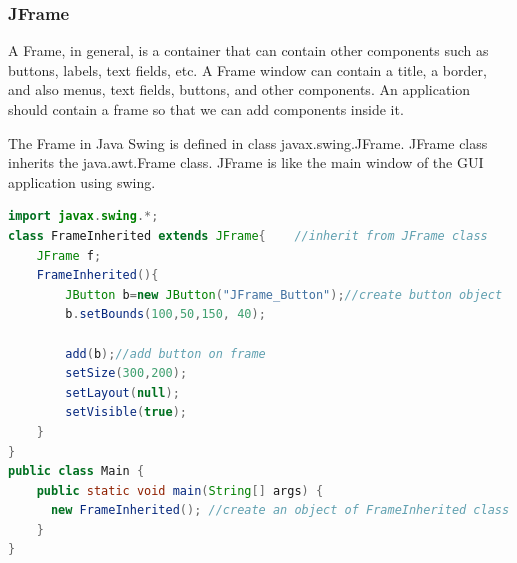 \documentclass[11pt]{article}
\begin{document}
\subsubsection{JFrame}

A Frame, in general, is a container that can contain other components such as buttons, labels, text fields, etc. A Frame window can contain a title, a border, and also menus, text fields, buttons, and other components. An application should contain a frame so that we can add components inside it.

The Frame in Java Swing is defined in class javax.swing.JFrame. JFrame class inherits the java.awt.Frame class. JFrame is like the main window of the GUI application using swing.

\begin{lstlisting}[language=Java]
import javax.swing.*;
class FrameInherited extends JFrame{    //inherit from JFrame class
    JFrame f;
    FrameInherited(){
        JButton b=new JButton("JFrame_Button");//create button object
        b.setBounds(100,50,150, 40);
 
        add(b);//add button on frame
        setSize(300,200);
        setLayout(null);
        setVisible(true);
    }
}
public class Main {
    public static void main(String[] args) {
      new FrameInherited(); //create an object of FrameInherited class
    }
}
\end{lstlisting}
\end{document}

